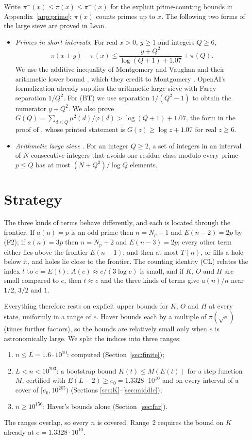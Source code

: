\documentclass[11pt]{article}
\theoremstyle{definition}
\theoremstyle{remark}
\newcommand{\piU}{\pi^{+}}
\newcommand{\piL}{\pi^{-}}
\begin{document}
Write $\piL(x)\le\pi(x)\le\piU(x)$ for the explicit prime-counting
bounds in Appendix~\ref{app:prime}; $\pi(x)$ counts primes up to $x$.
The following two forms of the large sieve are proved in Lean.
\begin{itemize}
\item[(BT)] \emph{Primes in short intervals.} For real $x>0$, $y\ge1$ and
  integers $Q\ge6$,
  \[\pi(x+y)-\pi(x)\le\frac{y+Q^2}{\log(Q+1)+1.07}+\pi(Q).\]
  We use the additive inequality of Montgomery and Vaughan
  \cite[Theorem~1]{mv} and their arithmetic lower bound
  \cite[(2.7)]{mv}, which they credit to Montgomery \cite{montgomery}.
  OpenAI's formalization \cite{oaimath} already supplies the arithmetic
  large sieve with Farey separation $1/Q^2$. For (BT) we use separation
  $1/(Q^2-1)$ to obtain the numerator $y+Q^2$. We also prove
  $G(Q)=\sum_{d\le Q}\mu^2(d)/\varphi(d)>\log(Q+1)+1.07$, the form
  in the proof of \cite[Lemma~7]{mv}, whose printed statement is
  $G(z)\ge\log z+1.07$ for real $z\ge6$.
\item[(LS)] \emph{Arithmetic large sieve} \cite{montgomery,mv}. For an integer $Q\ge2$, a set of
  integers in an interval of $N$ consecutive integers that avoids one
  residue class modulo every prime $p\le Q$ has at most
  $(N+Q^2)/\log Q$ elements.
\end{itemize}

\section{Strategy}\label{sec:overview}

The three kinds of terms behave differently, and each is located through
the frontier. If $a(n)=p$ is an odd prime then $n=N_p+1$ and $E(n-2)=2p$
by (F2); if $a(n)=3p$ then $n=N_p+2$ and $E(n-3)=2p$; every other term
either lies above the frontier $E(n-1)$, and then at most $T(n)$, or
fills a hole below it, and holes lie close to the frontier. The counting identity (CL) relates the index $t$ to $e=E(t)$:
$A(e)\approx e/(3\log e)$ is small, and if $K$, $O$ and $H$ are small
compared to $e$, then $t\approx e$ and the three kinds of terms give
$a(n)/n$ near $1/2$, $3/2$ and $1$.

Everything therefore rests on explicit upper bounds for $K$, $O$ and $H$
at every state, uniformly in a range of $e$. Haver bounds each by a
multiple of $\pi(\sqrt e)$ (times further factors), so the bounds are
relatively small only when $e$ is astronomically large. We split the
indices into three ranges:
\begin{enumerate}
\item $n\le L=1.6\cdot10^{10}$: computed (Section~\ref{sec:finite});
\item $L<n<10^{203}$: a bootstrap bound $K(t)\le M(E(t))$ for a step
  function $M$, certified with $E(L-2)\ge e_0=1.3328\cdot10^{10}$ and on
  every interval of a cover of $[e_0,10^{205})$ (Sections
  \ref{sec:K}--\ref{sec:middle});
\item $n\ge10^{156}$: Haver's bounds alone (Section~\ref{sec:far}).
\end{enumerate}
The ranges overlap, so every $n$ is covered. Range~2 requires the bound
on $K$ already at $e=1.3328\cdot10^{10}$.
\end{document}

